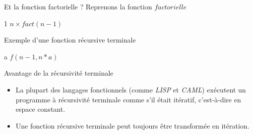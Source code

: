 \documentclass[10pt,xcolor=dvipsnames]{beamer}
\begin{document}
\begin{frame}{Et la fonction factorielle ?}
    Reprenons la fonction $factorielle$
    \begin{tcolorbox}
  \begin{algorithmic}[1]
        \State{} 1
      \Else
        \State{} $n \times fact(n-1)$
      \EndIf
    \EndFunction
  \end{algorithmic}
\end{tcolorbox}
\end{frame}

\begin{frame}{Exemple d'une fonction récursive terminale}
        \begin{tcolorbox}
  \begin{algorithmic}[1]
        \State{} a
      \Else
        \State{} $f(n-1,n*a)$
      \EndIf
    \EndFunction
  \end{algorithmic}
\end{tcolorbox}
\end{frame}

\begin{frame}{Avantage de la récursivité terminale}
    \begin{itemize}
        \item     La plupart des langages fonctionnels (comme \textit{LISP} et \textit{CAML}) exécutent un programme à récursivité terminale comme s'il était itératif, c'est-à-dire en espace constant.
        \item Une fonction récursive terminale peut toujours être transformée en itération.
    \end{itemize}


\end{frame}
\end{document}
